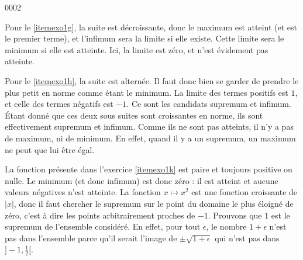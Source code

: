 
\begin{corrige}{0002}

Pour le \ref{itemexo1g}, la suite est décroissante, donc le maximum est atteint (et est le premier terme), et l'infimum sera la limite si elle existe. Cette limite sera le minimum si elle est atteinte. Ici, la limite est zéro, et n'est évidement pas atteinte.

Pour le \ref{itemexo1h}, la suite est alternée. Il faut donc bien se garder de prendre le plus petit en norme comme étant le minimum. La limite des termes positifs est $1$, et celle des termes négatifs est $-1$. Ce sont les candidats supremum et infimum. Étant donné que ces deux sous suites sont croissantes en norme, ils sont effectivement supremum et infimum. Comme ils ne sont pas atteints, il n'y a pas de maximum, ni de minimum. En effet, quand il y a un supremum, un maximum ne peut que lui être égal.

La fonction présente dans l'exercice \ref{itemexo1k} est paire et toujours positive ou nulle. Le minimum (et donc infimum) est donc zéro : il est atteint et aucune valeurs négatives n'est atteinte. La fonction $x\mapsto x^2$ est une fonction croissante de $| x |$, donc il faut chercher le supremum sur le point du domaine le plus éloigné de zéro, c'est à dire les points arbitrairement proches de $-1$. Prouvons que $1$ est le supremum de l'ensemble considéré. En effet, pour tout $\epsilon$, le nombre $1+\epsilon$ n'est pas dans l'ensemble parce qu'il serait l'image de $\pm\sqrt{1+\epsilon}$ qui n'est pas dans $]-1,\frac{1}{ 2 }[$.

\end{corrige}
